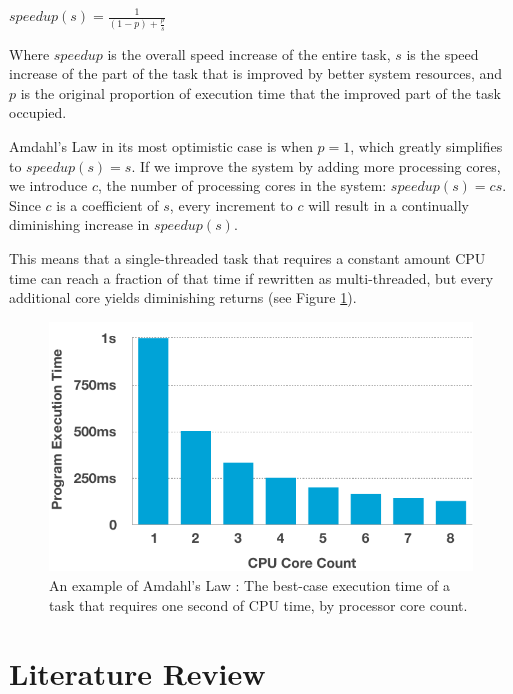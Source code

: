 \documentclass[11pt, a4paper, twocolumn]{article}
\begin{document}
\begin{center}
\begin{Large}
$speedup(s) = \frac{1}{(1-p)+\frac{p}{s}}$
\end{Large}
\end{center}

Where $speedup$ is the overall speed increase of the entire task, $s$ is the speed increase of the part of the task that is improved by better system resources, and $p$ is the original proportion of execution time that the improved part of the task occupied.

Amdahl's Law in its most optimistic case is when $p = 1$, which greatly simplifies to $speedup(s) = s$. If we improve the system by adding more processing cores, we introduce $c$, the number of processing cores in the system: $speedup(s) = cs$. Since $c$ is a coefficient of $s$, every increment to $c$ will result in a continually diminishing increase in $speedup(s)$.

This means that a single-threaded task that requires a constant amount CPU time can reach a fraction of that time if rewritten as multi-threaded, but every additional core yields diminishing returns (see Figure \ref{fig:cpu_cores}).

\begin{figure}[h]
\includegraphics[width=\linewidth]{cpu_cores}
\caption{An example of Amdahl's Law \citep{Rodgers1985}: The best-case execution time of a task that requires one second of CPU time, by processor core count.}
\label{fig:cpu_cores}
\end{figure}

\section{Literature Review}
\end{document}
